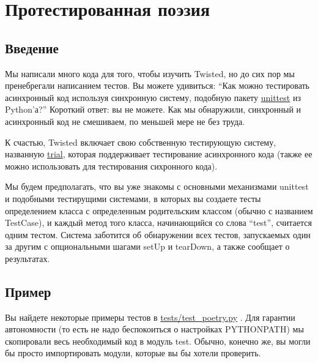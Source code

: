 
\section{Протестированная поэзия\label{sec:part15}}

\subsection{Введение}

Мы написали много кода для того, чтобы изучить Twisted, но 
до сих пор мы пренебрегали написанием тестов. 
Вы можете удивиться: ``Как можно тестировать асинхронный код 
используя синхронную систему, подобную пакету 
\href{http://docs.python.org/library/unittest.html#module-unittest}{unittest} 
из Python'а?'' Короткий ответ: вы не можете. Как мы обнаружили, 
синхронный и асинхронный код не смешиваем, по меньшей мере не без труда.


К счастью, Twisted включает свою собственную 
тестирующую систему, названную 
\href{http://twistedmatrix.com/documents/current/core/howto/testing.html}{trial}, 
которая поддерживает тестирование асинхронного кода (также ее можно 
использовать для тестирования сихронного кода).


Мы будем предполагать, что вы уже знакомы с 
основными механизмами unittest и подобными 
тестирущими системами, в которых вы создаете 
тесты определением класса с определенным родительским 
классом (обычно с названием TestCase), 
и каждый метод того класса, начинающийся со слова ``test'', 
считается одним тестом. Система заботится об обнаружении 
всех тестов, запускаемых один за другим с опциональными 
шагами setUp и tearDown, а также сообщает о результатах. 


\subsection{Пример}


Вы найдете некоторые примеры тестов в 
\href{http://github.com/jdavisp3/twisted-intro/blob/master/tests/test\_poetry.py#L1}{tests/test\_poetry.py} . Для гарантии автономности (то есть 
не надо беспокоиться о настройках PYTHONPATH) мы скопировали 
весь необходимый код в модуль test. Обычно, конечно же, вы могли бы 
просто импортировать модули, которые вы бы хотели проверить.


